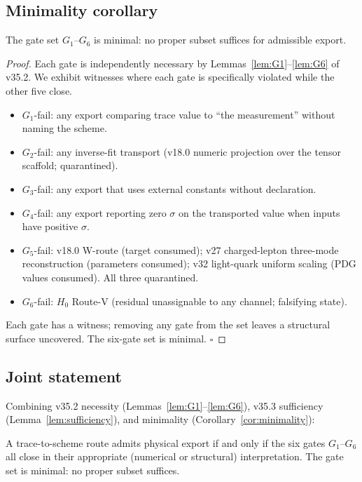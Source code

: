 \subsection{Minimality corollary}
\label{subsec:minimality-corollary}

\begin{corollary}[Minimality]
\label{cor:minimality}
The gate set $G_1$--$G_6$ is minimal: no proper subset suffices for admissible export.
\end{corollary}

\begin{proof}
Each gate is independently necessary by Lemmas~\ref{lem:G1}--\ref{lem:G6} of v35.2. We exhibit witnesses where each gate is specifically violated while the other five close.

\begin{itemize}
\item $G_1$-fail: any export comparing trace value to ``the measurement'' without naming the scheme.
\item $G_2$-fail: any inverse-fit transport (v18.0 numeric projection over the tensor scaffold; quarantined).
\item $G_3$-fail: any export that uses external constants without declaration.
\item $G_4$-fail: any export reporting zero $\sigma$ on the transported value when inputs have positive $\sigma$.
\item $G_5$-fail: v18.0 W-route (target consumed); v27 charged-lepton three-mode reconstruction (parameters consumed); v32 light-quark uniform scaling (PDG values consumed). All three quarantined.
\item $G_6$-fail: $H_0$ Route-V (residual unassignable to any channel; falsifying state).
\end{itemize}

Each gate has a witness; removing any gate from the set leaves a structural surface uncovered. The six-gate set is minimal. $\square$
\end{proof}

\subsection{Joint statement}
\label{subsec:joint-statement}

Combining v35.2 necessity (Lemmas~\ref{lem:G1}--\ref{lem:G6}), v35.3 sufficiency (Lemma~\ref{lem:sufficiency}), and minimality (Corollary~\ref{cor:minimality}):

\begin{theorem}
\label{thm:export-necessary-sufficient}
A trace-to-scheme route admits physical export if and only if the six gates $G_1$--$G_6$ all close in their appropriate (numerical or structural) interpretation. The gate set is minimal: no proper subset suffices.
\end{theorem}

